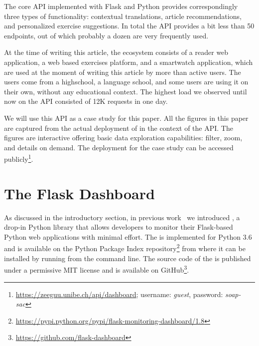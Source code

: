 \documentclass{sig-alternate-05-2015}
\begin{document}
  The core API implemented with Flask and Python provides correspondingly three types of functionality: contextual translations, article recommendations, and personalized exercise suggestions. In total the API provides a bit less than 50 endpoints, out of which probably a dozen are very frequently used. 

  At the time of writing this article, the ecosystem consists of a reader web application, a web based exercises platform, and a smartwatch application, which are used at the moment of writing this article by more than \activeUserCount active users. The users come from a highschool, a language school, and some users are using it on their own, without any educational context. The highest load we observed until now on the API consisted of 12K requests in one day.

  
  We will use this \zee API as a case study for this paper. 
  All the figures in this paper are captured from the actual deployment of \tool in the context of the \zee API. The figures are interactive offering basic data exploration capabilities: filter, zoom, and details on demand\cite{Shne99a}. The \tool deployment for the case study can be accessed publicly\footnote{\url{https://zeeguu.unibe.ch/api/dashboard}; username: {\em guest}, password: {\em soap-sac}}. 




\section{The Flask Dashboard}
\label{sec:tool}


  As discussed in the introductory section, in previous work~\cite{vogel2017low} we introduced \tool, a drop-in Python library that allows developers to monitor their Flask-based Python web applications with minimal effort.
%
  The \tool is implemented for Python 3.6 and is available on the Python Package Index repository\footnote{\url{https://pypi.python.org/pypi/flask-monitoring-dashboard/1.8}} from where it can be installed by running \install from the command line. 
%  
  The source code of the \tool is published under a permissive MIT license and is available on GitHub\footnote{\url{https://github.com/flask-dashboard}}.
  
\end{document}
